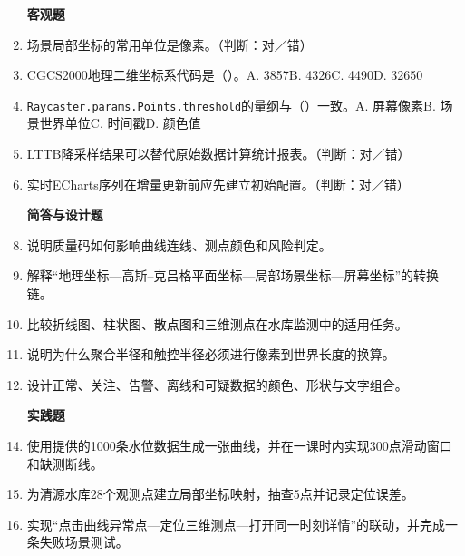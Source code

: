\begin{enumerate}
\item[\textbf{客观题}]
\item 场景局部坐标的常用单位是像素。（判断：对／错）
\item CGCS2000地理二维坐标系代码是（\quad）。A. 3857\quad B. 4326\quad C. 4490\quad D. 32650
\item \texttt{Raycaster.params.Points.threshold}的量纲与（\quad）一致。A. 屏幕像素\quad B. 场景世界单位\quad C. 时间戳\quad D. 颜色值
\item LTTB降采样结果可以替代原始数据计算统计报表。（判断：对／错）
\item 实时ECharts序列在增量更新前应先建立初始配置。（判断：对／错）

\item[\textbf{简答与设计题}]
\item 说明质量码如何影响曲线连线、测点颜色和风险判定。
\item 解释“地理坐标—高斯--克吕格平面坐标—局部场景坐标—屏幕坐标”的转换链。
\item 比较折线图、柱状图、散点图和三维测点在水库监测中的适用任务。
\item 说明为什么聚合半径和触控半径必须进行像素到世界长度的换算。
\item 设计正常、关注、告警、离线和可疑数据的颜色、形状与文字组合。

\item[\textbf{实践题}]
\item 使用提供的1000条水位数据生成一张曲线，并在一课时内实现300点滑动窗口和缺测断线。
\item 为清源水库28个观测点建立局部坐标映射，抽查5点并记录定位误差。
\item 实现“点击曲线异常点—定位三维测点—打开同一时刻详情”的联动，并完成一条失败场景测试。
\end{enumerate}
